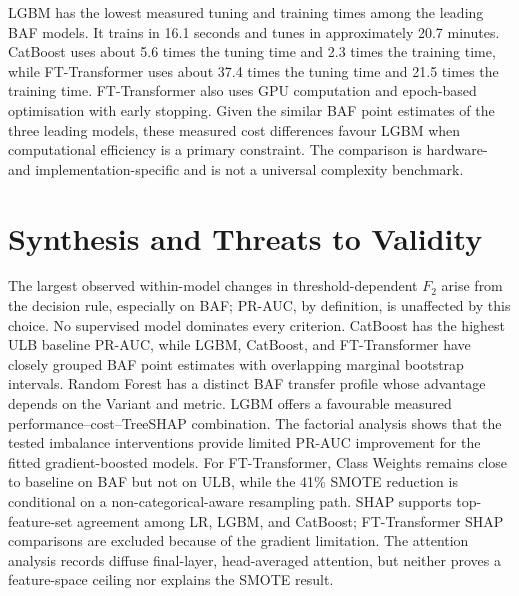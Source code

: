 LGBM has the lowest measured tuning and training times among the leading BAF models. It trains in 16.1 seconds and tunes in approximately 20.7 minutes. CatBoost uses about 5.6 times the tuning time and 2.3 times the training time, while FT-Transformer uses about 37.4 times the tuning time and 21.5 times the training time. FT-Transformer also uses GPU computation and epoch-based optimisation with early stopping. Given the similar BAF point estimates of the three leading models, these measured cost differences favour LGBM when computational efficiency is a primary constraint. The comparison is hardware- and implementation-specific and is not a universal complexity benchmark.

\clearpage

\section{Synthesis and Threats to Validity}
\label{sec:discussion}

The largest observed within-model changes in threshold-dependent $F_2$ arise from the decision rule, especially on BAF; PR-AUC, by definition, is unaffected by this choice. No supervised model dominates every criterion. CatBoost has the highest ULB baseline PR-AUC, while LGBM, CatBoost, and FT-Transformer have closely grouped BAF point estimates with overlapping marginal bootstrap intervals. Random Forest has a distinct BAF transfer profile whose advantage depends on the Variant and metric. LGBM offers a favourable measured performance--cost--TreeSHAP combination. The factorial analysis shows that the tested imbalance interventions provide limited PR-AUC improvement for the fitted gradient-boosted models. For FT-Transformer, Class Weights remains close to baseline on BAF but not on ULB, while the 41\% SMOTE reduction is conditional on a non-categorical-aware resampling path. SHAP supports top-feature-set agreement among LR, LGBM, and CatBoost; FT-Transformer SHAP comparisons are excluded because of the gradient limitation. The attention analysis records diffuse final-layer, head-averaged attention, but neither proves a feature-space ceiling nor explains the SMOTE result.

